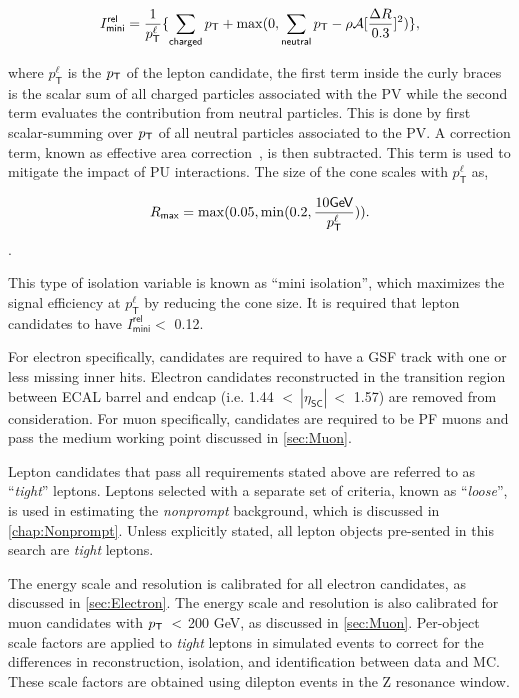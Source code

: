 \begin{equation}
\label{eq:mini}
I^{\textsf{rel}}_{\textsf{mini}} = \frac{1}{p_{\textsf{T}}^{\ell}} \{\sum_{\textsf{charged}}p_{\textsf{T}}+\max(0,\sum_{\textsf{neutral}}p_{\textsf{T}}-\rho \mathcal{A}[\frac{\mathrm{\Delta}R}{0.3}]^2)\},
\end{equation}

where $p_{\textsf{T}}^{\ell}$ is the $p_{\textsf{T}}$ of the lepton candidate, the first term inside the curly braces is the scalar sum of all charged particles associated with the \ac{PV} while the second term evaluates the contribution from neutral particles. This is done by first scalar-summing over $p_{\textsf{T}}$ of all neutral particles associated to the \ac{PV}. A correction term, known as effective area correction~\cite{Cacciari:2007fd}, is then subtracted. This term is used to mitigate the impact of \ac{PU} interactions. The size of the cone scales with $p_{\textsf{T}}^{\ell}$ as,  

\begin{equation}
R_{\textsf{max}} = \max (0.05, \min(0.2, \frac{10\textsf{GeV}}{p_{\textsf{T}}^{\ell}})).
\end{equation}.

This type of isolation variable is known as ``mini isolation'', which maximizes the signal efficiency at $p_{\textsf{T}}^{\ell}$ by reducing the cone size. It is required that lepton candidates to have $I^{\textsf{rel}}_{\textsf{mini}}<$ 0.12.

For electron specifically, candidates are required to have a GSF track with one or less missing inner hits. Electron candidates reconstructed in the transition region between ECAL barrel and endcap (i.e. 1.44 $<~|\eta_{\textsf{SC}}|~<$ 1.57) are removed from consideration. For muon specifically, candidates are required to be \ac{PF} muons and pass the medium working point discussed in \autoref{sec:Muon}.

Lepton candidates that pass all requirements stated above are referred to as ``\emph{tight}'' leptons. Leptons selected with a separate set of criteria, known as ``\emph{loose}'', is used in estimating the \emph{nonprompt} background, which is discussed in \autoref{chap:Nonprompt}. Unless explicitly stated, all lepton objects pre-sented in this search are \emph{tight} leptons.

The energy scale and resolution is calibrated for all electron candidates, as discussed in \autoref{sec:Electron}. The energy scale and resolution is also calibrated for muon candidates with $p_{\textsf{T}}~<$ 200 GeV, as discussed in \autoref{sec:Muon}. Per-object scale factors are applied to \emph{tight} leptons in simulated events to correct for the differences in reconstruction, isolation, and identification between data and \ac{MC}. These scale factors are obtained using dilepton events in the Z resonance window.
